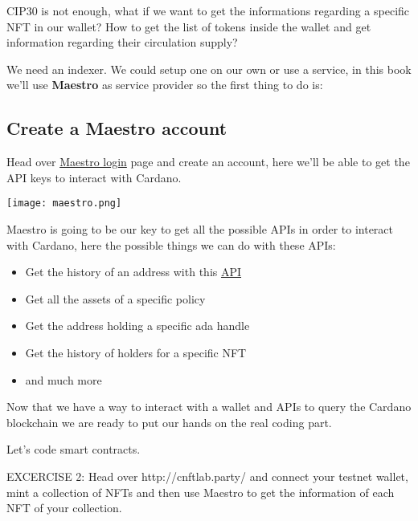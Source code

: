 CIP30 is not enough, what if we want to get the informations regarding a specific NFT in our wallet?
How to get the list of tokens inside the wallet and get information regarding their circulation supply?

We need an indexer. We could setup one on our own or use a service, in this book we'll use \textbf{Maestro} as service provider so the first thing to do is:

\subsection{Create a Maestro account}

Head over \href{https://dashboard.gomaestro.org/login}{Maestro login} page and create an account, here we'll be able to get the API keys to interact with Cardano.

\texttt{[image: maestro.png]}

Maestro is going to be our key to get all the possible APIs in order to interact with Cardano, here the possible things we can do with these APIs:

\begin{itemize}
    \item Get the history of an address with this \href{ttps://docs.gomaestro.org/Indexer-API/Addresses/txs-by-address}{API}
    \item Get all the assets of a specific policy 
    \item Get the address holding a specific ada handle
    \item Get the history of holders for a specific NFT 
    \item and much more 
\end{itemize}

Now that we have a way to interact with a wallet and APIs to query the Cardano blockchain we are ready to put our hands on the real coding part.

Let's code smart contracts.

\begin{remark}
    EXCERCISE 2: Head over http://cnftlab.party/ and connect your testnet wallet, mint a collection of NFTs and then use Maestro to get the information of each NFT of your collection.
\end{remark}


